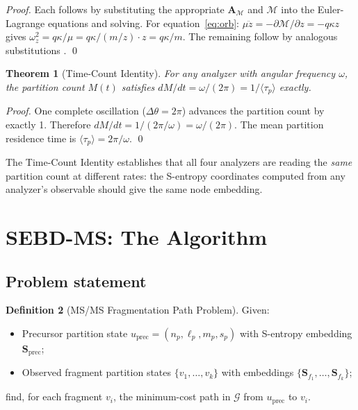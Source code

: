 \documentclass[twocolumn,10pt,a4paper]{article}
\theoremstyle{thmstyle}
\newtheorem{theorem}{Theorem}[section]
\theoremstyle{definition}
\newtheorem{definition}[theorem]{Definition}
\theoremstyle{remark}
\newcommand{\Sv}{\mathbf{S}}
\newcommand{\AM}{\mathbf{A}_{\mathcal{M}}}
\newcommand{\Mop}{\mathcal{M}}
\newcommand{\tp}{\langle\tau_{p}\rangle}
\newcommand{\calG}{\mathcal{G}}
\newcommand{\Mcyc}{M}
\begin{document}
\begin{proof}
Each follows by substituting the appropriate $\AM$ and $\Mop$ into the
Euler-Lagrange equations and solving. For equation~\eqref{eq:orb}:
$\mu\ddot{z} = -\partial\Mop/\partial z = -q\kappa z$ gives
$\omega_z^2 = q\kappa/\mu = q\kappa/(m/z) \cdot z = q\kappa/m$.
The remaining follow by analogous substitutions \citep{makarov2000,
marshall1998, paul1990, wiley1955}. \qed
\end{proof}

\begin{theorem}[Time-Count Identity]
\label{thm:time-count}
For any analyzer with angular frequency $\omega$, the partition count
$\Mcyc(t)$ satisfies $d\Mcyc/dt = \omega/(2\pi) = 1/\tp$ exactly.
\end{theorem}

\begin{proof}
One complete oscillation ($\Delta\theta = 2\pi$) advances the partition
count by exactly 1. Therefore $d\Mcyc/dt = 1/(2\pi/\omega) =
\omega/(2\pi)$. The mean partition residence time is $\tp = 2\pi/\omega$.
\qed
\end{proof}

The Time-Count Identity establishes that all four analyzers are reading
the \emph{same} partition count at different rates: the S-entropy
coordinates computed from any analyzer's observable should give the
same node embedding.

\section{SEBD-MS: The Algorithm}
\label{sec:algorithm}

\subsection{Problem statement}

\begin{definition}[MS/MS Fragmentation Path Problem]
\label{def:problem}
Given:
\begin{itemize}[nosep]
\item Precursor partition state $u_\text{prec} = (n_p, \ell_p, m_p, s_p)$
  with S-entropy embedding $\Sv_\text{prec}$;
\item Observed fragment partition states $\{v_1, \ldots, v_k\}$ with
  embeddings $\{\Sv_{f_1}, \ldots, \Sv_{f_k}\}$;
\end{itemize}
find, for each fragment $v_i$, the minimum-cost path in $\calG$ from
$u_\text{prec}$ to $v_i$.
\end{definition}
\end{document}
